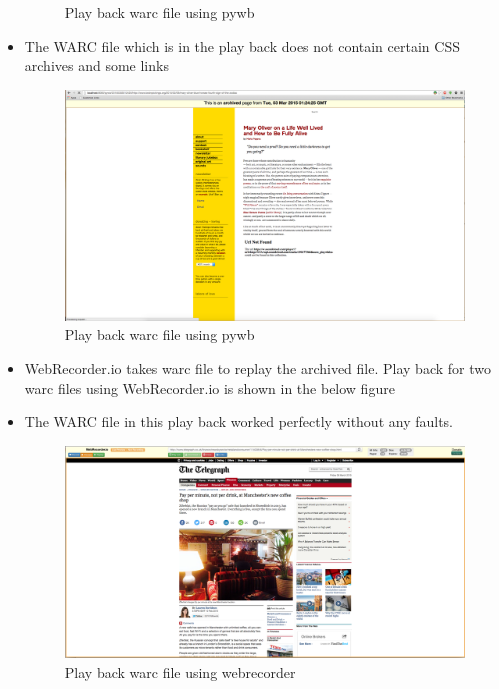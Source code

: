 \begin{itemize}
\begin{figure}
\begin{center}
		  	 		\caption{Play back warc file using pywb}
			  \end{center}
		  \end{figure}	
	\item The WARC file which is in the play back does not contain certain CSS archives and some links
		  \begin{figure}
		  	 \begin{center}
		  	 		\includegraphics[scale=0.40]{pywbplayback2.png}
		  	 		\caption{Play back warc file using pywb}
			  \end{center}
		  \end{figure}
	\item WebRecorder.io takes warc file to replay the archived file. Play back for two warc files using WebRecorder.io is shown in the below figure
	\item The WARC file in this play back worked perfectly without any faults.		
		\begin{figure}
		  	 \begin{center}
		  	 		\includegraphics[scale=0.40]{webrecorderplayback.png}
		  	 		\caption{Play back warc file using webrecorder}

\end{center}
\end{figure}
\end{itemize}
